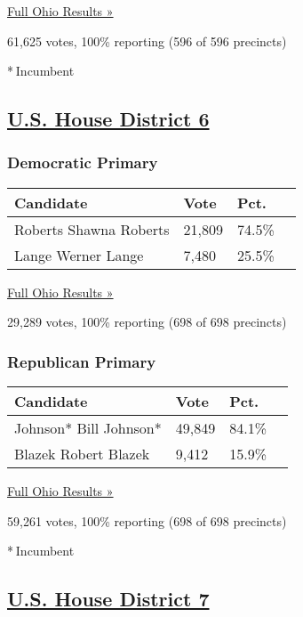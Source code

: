 \href{https://www.nytimes3xbfgragh.onion/elections/results/ohio}{Full
Ohio Results »}

61,625 votes, 100\% reporting (596 of 596 precincts)

* Incumbent

\hypertarget{us-house-district-6}{%
\subsection{\texorpdfstring{\href{https://www.nytimes3xbfgragh.onion/elections/results/ohio-house-district-6-primary-election}{U.S.
House District 6}}{U.S. House District 6}}\label{us-house-district-6}}

\hypertarget{democratic-primary-7}{%
\subsubsection{Democratic Primary}\label{democratic-primary-7}}

\begin{longtable}[]{@{}llll@{}}
\toprule
Candidate & Vote & Pct. &\tabularnewline
\midrule
\endhead
 Roberts Shawna Roberts & 21,809 & 74.5\% &\tabularnewline
 Lange Werner Lange & 7,480 & 25.5\% &\tabularnewline
\bottomrule
\end{longtable}

\href{https://www.nytimes3xbfgragh.onion/elections/results/ohio}{Full
Ohio Results »}

29,289 votes, 100\% reporting (698 of 698 precincts)

\hypertarget{republican-primary-7}{%
\subsubsection{Republican Primary}\label{republican-primary-7}}

\begin{longtable}[]{@{}llll@{}}
\toprule
Candidate & Vote & Pct. &\tabularnewline
\midrule
\endhead
 Johnson* Bill Johnson* & 49,849 & 84.1\% &\tabularnewline
 Blazek Robert Blazek & 9,412 & 15.9\% &\tabularnewline
\bottomrule
\end{longtable}

\href{https://www.nytimes3xbfgragh.onion/elections/results/ohio}{Full
Ohio Results »}

59,261 votes, 100\% reporting (698 of 698 precincts)

* Incumbent

\hypertarget{us-house-district-7}{%
\subsection{\texorpdfstring{\href{https://www.nytimes3xbfgragh.onion/elections/results/ohio-house-district-7-primary-election}{U.S.
House District 7}}{U.S. House District 7}}\label{us-house-district-7}}

